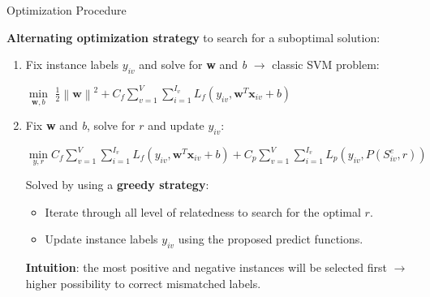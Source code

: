 \documentclass{beamer}
\begin{document}
\begin{frame}{Optimization Procedure} 	

		\textbf{Alternating optimization strategy} to search for a suboptimal solution:

\begin{enumerate}
	\item Fix instance labels $y_{iv}$ and solve for \textbf{w} and \textit{b} $\rightarrow$ classic SVM problem:
	
		\begin{center}
	\small{$\min\limits_{\textbf{w},b}$ $\frac{1}{2} \left \| \textbf{w} \right \|^{2} + C_{f} \sum_{v=1}^{V}\sum_{i=1}^{I_{v}}L_{f}\left ( y_{iv}, \textbf{w}^{T}\textbf{x}_{iv}+b \right )$}
		\end{center}
	
	\item Fix \textbf{w} and \textit{b}, solve for $r$ and update $y_{iv}$:
	
		\begin{center}
	\small{$\min\limits_{y,r} C_{f} \sum_{v=1}^{V}\sum_{i=1}^{I_{v}}L_{f}\left ( y_{iv}, \textbf{w}^{T}\textbf{x}_{iv}+b \right )
	+ C_{p} \sum_{v=1}^{V}\sum_{i=1}^{I_{v}}L_{p}\left ( y_{iv}, P(S_{iv}^{e},r) \right )$}
		\end{center}
		
		Solved by using a \textbf{greedy strategy}: 
		\begin{itemize}
			\item Iterate through all level of relatedness to search for the optimal $r$.
			\item Update instance labels $y_{iv}$ using the proposed predict functions.
		\end{itemize}
		\textbf{Intuition}: the most positive and negative instances will be selected first $\rightarrow$ higher possibility to correct mismatched labels.
\end{enumerate}
	
	
\end{frame}	
\end{document}
